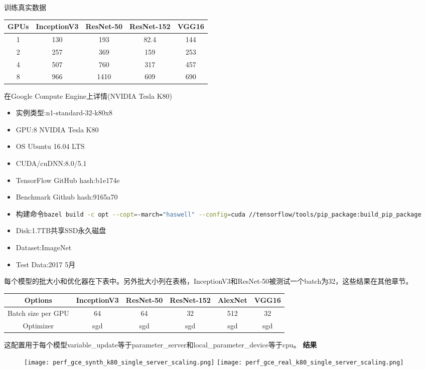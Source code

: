 训练真实数据
\begin{table}
	\centering
	\begin{tabular}{|c|c|c|c|c|}
		\hline
		GPUs	&InceptionV3	&ResNet-50	&ResNet-152	&VGG16\\
		\hline
		1	&130	&193	&82.4	&144\\
		\hline
		2	&257	&369	&159	&253\\
		\hline
		4	&507	&760	&317	&457\\
		\hline
		8	&966	&1410	&609	&690\\
		\hline
	\end{tabular}
\end{table}
在Google Compute Engine上详情(NVIDIA Tesla K80)
\begin{itemize}
	\item  实例类型:n1-standard-32-k80x8
	\item  GPU:8 NVIDIA Tesla K80
	\item OS Ubuntu 16.04 LTS 
	\item CUDA/cuDNN:8.0/5.1
	\item TensorFlow GitHub hash:b1e174e
	\item Benchmark Github hash:9165a70
	\item 构建命令\lstinline[language=Bash]{bazel build -c opt --copt=-march="haswell" --config=cuda //tensorflow/tools/pip_package:build_pip_package}
	\item Disk:1.7TB共享SSD永久磁盘
	\item Dataset:ImageNet 
	\item Test Data:2017 5月
\end{itemize}
每个模型的批大小和优化器在下表中。另外批大小列在表格，InceptionV3和ResNet-50被测试一个batch为32，这些结果在其他章节。
\begin{table}[H]
	\centering
	\begin{tabular}{|c|c|c|c|c|c|}
		\hline
		Options	&InceptionV3	&ResNet-50	&ResNet-152	&AlexNet	&VGG16\\
		\hline
		Batch size per GPU	&64	&64	&32	&512	&32\\
		\hline
		Optimizer	&sgd	&sgd	&sgd	&sgd	&sgd\\
		\hline
	\end{tabular}
\end{table}
这配置用于每个模型variable\_update等于parameter\_server和local\_parameter\_device等于cpu。
\textbf{结果}\\
\begin{figure}[H]
	\centering
	\texttt{[image: perf\_gce\_synth\_k80\_single\_server\_scaling.png]}
	\texttt{[image: perf\_gce\_real\_k80\_single\_server\_scaling.png]}
\end{figure}
